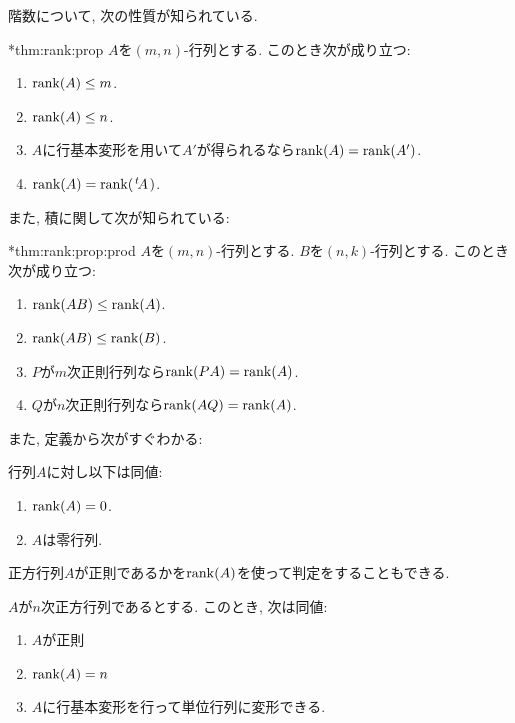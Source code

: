 階数について, 次の性質が知られている.
\begin{theorem}
  \provelater**{thm:rank:prop}
  \label{thm:rank:prop}
  $A$を$(m,n)$-行列とする.
  このとき次が成り立つ:
  \begin{enumerate}
  \item
    \label{thm:rank:prop:row}
    $\operatorname{rank}(A)\leq m$.
  \item
    \label{thm:rank:prop:col}
    $\operatorname{rank}(A)\leq n$.
  \item
    \label{thm:rank:prop:fund}
    $A$に行基本変形を用いて$A'$が得られるなら$\operatorname{rank}(A)=\operatorname{rank}(A')$.
  \item
    \label{thm:rank:prop:trans}
    $\operatorname{rank}(A)=\operatorname{rank}({\left.^{t}\!A\right.})$.
  \end{enumerate}
\end{theorem}
また, 積に関して次が知られている:
\begin{theorem}
  \provelater**{thm:rank:prop:prod}
  \label{thm:rank:prop:prod}
  $A$を$(m,n)$-行列とする.
  $B$を$(n,k)$-行列とする.
  このとき次が成り立つ:
  \begin{enumerate}
  \item
    \label{thm:rank:prop:left}
    $\operatorname{rank}(AB)\leq\operatorname{rank}(A)$.
  \item
    \label{thm:rank:prop:right}
    $\operatorname{rank}(AB)\leq\operatorname{rank}(B)$.
  \item
    $P$が$m$次正則行列なら$\operatorname{rank}(PA)=\operatorname{rank}(A)$.
  \item
    \label{thm:rank:prop:regularright}
    $Q$が$n$次正則行列なら$\operatorname{rank}(AQ)=\operatorname{rank}(A)$.
  \end{enumerate}
\end{theorem}
また, 定義から次がすぐわかる:
\begin{prop}
  行列$A$に対し以下は同値:
  \begin{enumerate}
  \item $\operatorname{rank}(A)=0$.
  \item $A$は零行列.
  \end{enumerate}
\end{prop}

正方行列$A$が正則であるかを$\operatorname{rank}(A)$を使って判定をすることもできる.
\begin{theorem}
  \label{thm:rank:regular}
  $A$が$n$次正方行列であるとする.
  このとき, 次は同値:
  \begin{enumerate}
  \item\label{thm:rank:regular:reg}
    $A$が正則
  \item\label{thm:rank:regular:rank}
    $\operatorname{rank}(A)=n$
  \item\label{thm:rank:regular:step}
    $A$に行基本変形を行って単位行列に変形できる.
  \end{enumerate}
\end{theorem}


